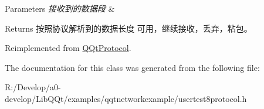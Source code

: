 \begin{DoxyParams}{Parameters}
{\em 接收到的数据段} & \\
\hline
\end{DoxyParams}
\begin{DoxyReturn}{Returns}
按照协议解析到的数据长度 可用，继续接收，丢弃，粘包。 
\end{DoxyReturn}


Reimplemented from \mbox{\hyperlink{class_q_qt_protocol_a00fd0c1ac23379ed3b9b25da9a34f39b}{Q\+Qt\+Protocol}}.



The documentation for this class was generated from the following file\+:\begin{DoxyCompactItemize}
\item 
R\+:/\+Develop/a0-\/develop/\+Lib\+Q\+Qt/examples/qqtnetworkexample/usertest8protocol.\+h\end{DoxyCompactItemize}
